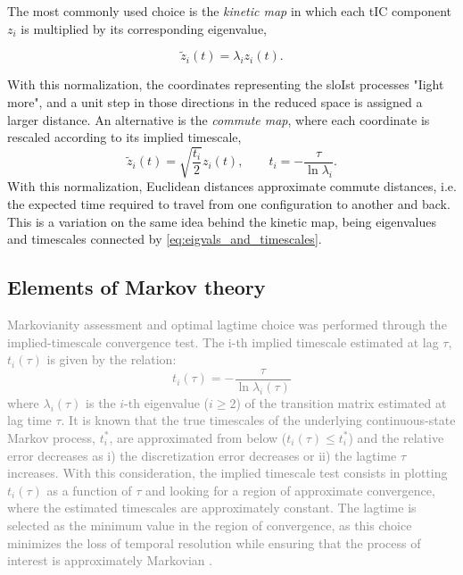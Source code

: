 The most commonly used choice is the \textit{kinetic map} in which each tIC component $z_i$ is multiplied by its corresponding eigenvalue,

\begin{equation}
\tilde z_i(t) = \lambda_i z_i(t).
\end{equation}

With this normalization, the coordinates representing the sloIst processes "Iight more", and a unit step in those directions in the reduced space is assigned a larger distance.
An alternative is the \textit{commute map}, where each coordinate is rescaled according to its implied timescale,
\begin{equation}
\tilde z_i(t) = \sqrt{\frac{t_i}{2}} z_i(t), \qquad t_i = -\frac{\tau}{\ln \lambda_i}.
\end{equation}
With this normalization, Euclidean distances approximate commute distances, i.e. the expected time required to travel from one configuration to another and back. This is a variation on the same idea behind the kinetic map, being eigenvalues and timescales connected by \eqref{eq:eigvals_and_timescales}.



\subsection{Elements of Markov theory}
\label{suppsec:markov_theory}

\textcolor{gray}{
Markovianity assessment and optimal lagtime choice was performed through the implied-timescale convergence test. The i-th implied timescale estimated at lag $\tau$,  $t_i(\tau)$ is given by the relation:
\begin{equation}
t_i(\tau) = -\frac{\tau}{\ln \lambda_i(\tau)}
\end{equation}
where $\lambda_i(\tau)$ is the $i$-th eigenvalue ($i \geq 2$) of the transition matrix estimated at lag time $\tau$.
It is known that the true timescales of the underlying continuous-state Markov process, $t_i^{*}$, are approximated from below ($t_i(\tau) \leq t_i^{*}$) and the relative error decreases as
i) the discretization error decreases or ii) the lagtime $\tau$ increases. With this consideration, the implied timescale test consists in plotting $t_i(\tau)$ as a function of $\tau$ and looking for a region of approximate convergence, where the estimated timescales are approximately constant.
The lagtime is selected as the minimum value in the region of convergence, as this choice minimizes the loss of temporal resolution while ensuring that the process of interest is approximately Markovian \cite[Ch. 4.7]{thebible}. 
}

